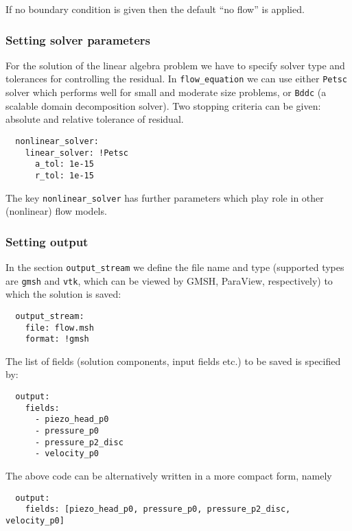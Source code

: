 If no boundary condition is given then the default ``no flow'' is
applied.

\subsubsection{Setting solver parameters}

For the solution of the linear algebra problem we have to specify solver
type and tolerances for controlling the residual. In
\texttt{flow\_equation} we can use either \texttt{Petsc} solver which
performs well for small and moderate size problems, or \texttt{Bddc} (a
scalable domain decomposition solver). Two stopping criteria can be
given: absolute and relative tolerance of residual.

\begin{verbatim}
  nonlinear_solver:
    linear_solver: !Petsc
      a_tol: 1e-15
      r_tol: 1e-15
\end{verbatim}

The key \texttt{nonlinear\_solver} has further parameters which play
role in other (nonlinear) flow models.

\subsubsection{Setting output}

In the section \texttt{output\_stream} we define the file name and type
(supported types are \texttt{gmsh} and \texttt{vtk}, which can be viewed
by GMSH, ParaView, respectively) to which the solution is saved:

\begin{verbatim}
  output_stream:
    file: flow.msh
    format: !gmsh
\end{verbatim}

The list of fields (solution components, input fields etc.) to be saved
is specified by:

\begin{verbatim}
  output:
    fields:
      - piezo_head_p0
      - pressure_p0
      - pressure_p2_disc
      - velocity_p0
\end{verbatim}

The above code can be alternatively written in a more compact form,
namely

\begin{verbatim}
  output:
    fields: [piezo_head_p0, pressure_p0, pressure_p2_disc, velocity_p0]
\end{verbatim}

